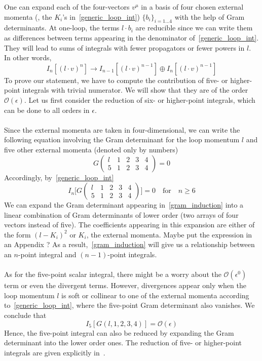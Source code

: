 One can expand each of the four-vectors $v^\mu$ in a basis of four chosen external momenta (\ie , the $K_i$'s in~\cref{generic_loop_int}) $\{b_i\}_{i=1\ldots 4}$ with the help of Gram determinants.
At one-loop, the terms $l\cdot b_i$ are reducible since we can write them as differences between terms appearing in the denominator of~\cref{generic_loop_int}.
They will lead to sums of integrals with fewer propagators or fewer powers in $l$. 
In other words, 
\begin{equation*}
I_n[(l\cdot v)^n] \rightarrow I_{n-1}[(l\cdot v)^{n-1}]\oplus I_n[(l\cdot v)^{n-1}]
\end{equation*}
To prove our statement, we have to compute the contribution of five- or higher-point integrals with trivial numerator. 
We will show that they are of the order $\mathcal{O}(\epsilon)$.
Let us first consider the reduction of six- or higher-point integrals, which can be done to all orders in $\epsilon$. 
\\\\
Since the external momenta are taken in four-dimensional,
we can write the following equation involving the Gram determinant for the loop momentum $l$ and five other external momenta (denoted only by numbers) 
\begin{equation*}
G\begin{pmatrix}
l & 1 & 2 & 3 & 4\\
5 & 1 & 2 & 3 & 4 
\end{pmatrix}
 = 0
\end{equation*}
Accordingly, by~\cref{generic_loop_int}
\begin{equation}\label{gram_induction}
I_n\Big[G\begin{pmatrix}
l & 1 & 2 & 3 & 4\\
5 & 1 & 2 & 3 & 4 
\end{pmatrix}\Big]
 = 0
 \quad\mathrm{for}\quad n\geq 6
\end{equation}
We can expand the Gram determinant appearing in~\cref{gram_induction} into a linear combination of Gram determinants of lower order (two arrays of four vectors instead of five).
The coefficients appearing in this expansion are either of the form $(l-K_i)^2$ or $K_i$, the external momenta.
\color{red} Maybe put the expression in an Appendix ?\color{black}
As a result,~\cref{gram_induction} will give us a relationship between an $n$-point integral and $(n-1)$-point integrals.
\\\\
As for the five-point scalar integral, there might be a worry about the $\mathcal{O}(\epsilon^0)$ term or even the divergent terms.
However, divergences appear only when the loop momentum $l$ is soft or collinear to one of the external momenta according to~\cref{generic_loop_int}, where the five-point Gram determinant also vanishes. 
We conclude that
\begin{equation*}
I_5[G(l,1,2,3,4)] = \mathcal{O}(\epsilon)
\end{equation*}
Hence, the five-point integral can also be reduced by expanding the Gram determinant into the lower order ones.
The reduction of five- or higher-point integrals are given explicitly in~\cite{Gluza:2010ws}.
%
%





